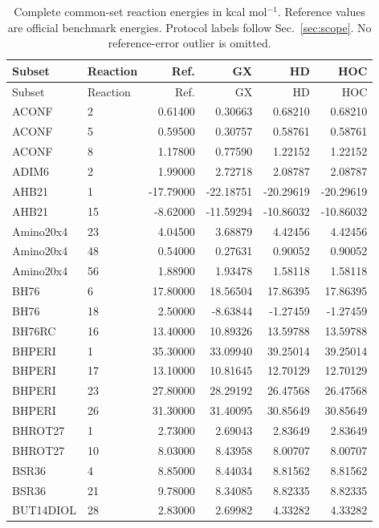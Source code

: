 {\small
\begin{longtable}{llrrrr}
\caption{Complete common-set reaction energies in kcal mol$^{-1}$. Reference values are official benchmark energies. Protocol labels follow Sec.~\ref{sec:scope}. No reference-error outlier is omitted.}\label{tab:molecular-reactions}\\
\toprule
Subset & Reaction & Ref. & GX & HD & HOC\\
\midrule
\endfirsthead
\toprule
Subset & Reaction & Ref. & GX & HD & HOC\\
\midrule
\endhead
ACONF & 2 & 0.61400 & 0.30663 & 0.68210 & 0.68210 \\
ACONF & 5 & 0.59500 & 0.30757 & 0.58761 & 0.58761 \\
ACONF & 8 & 1.17800 & 0.77590 & 1.22152 & 1.22152 \\
ADIM6 & 2 & 1.99000 & 2.72718 & 2.08787 & 2.08787 \\
AHB21 & 1 & -17.79000 & -22.18751 & -20.29619 & -20.29619 \\
AHB21 & 15 & -8.62000 & -11.59294 & -10.86032 & -10.86032 \\
Amino20x4 & 23 & 4.04500 & 3.68879 & 4.42456 & 4.42456 \\
Amino20x4 & 48 & 0.54000 & 0.27631 & 0.90052 & 0.90052 \\
Amino20x4 & 56 & 1.88900 & 1.93478 & 1.58118 & 1.58118 \\
BH76 & 6 & 17.80000 & 18.56504 & 17.86395 & 17.86395 \\
BH76 & 18 & 2.50000 & -8.63844 & -1.27459 & -1.27459 \\
BH76RC & 16 & 13.40000 & 10.89326 & 13.59788 & 13.59788 \\
BHPERI & 1 & 35.30000 & 33.09940 & 39.25014 & 39.25014 \\
BHPERI & 17 & 13.10000 & 10.81645 & 12.70129 & 12.70129 \\
BHPERI & 23 & 27.80000 & 28.29192 & 26.47568 & 26.47568 \\
BHPERI & 26 & 31.30000 & 31.40095 & 30.85649 & 30.85649 \\
BHROT27 & 1 & 2.73000 & 2.69043 & 2.83649 & 2.83649 \\
BHROT27 & 10 & 8.03000 & 8.43958 & 8.00707 & 8.00707 \\
BSR36 & 4 & 8.85000 & 8.44034 & 8.81562 & 8.81562 \\
BSR36 & 21 & 9.78000 & 8.34085 & 8.82335 & 8.82335 \\
BUT14DIOL & 28 & 2.83000 & 2.69982 & 4.33282 & 4.33282 \\

\end{longtable}}
